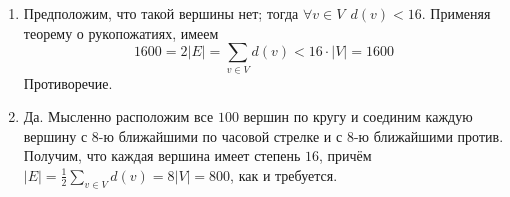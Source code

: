 \begin{Answer}
    \noindent
    \begin{enumerate}[label=\textbf{\alph*)}]
        \item
            Предположим, что такой вершины нет;
            тогда $ \forall v \in V \;\, d(v) < 16 $.
            Применяя теорему о рукопожатиях, имеем
            \[
                1600 = 2 |E| = \sum_{v \in V} d(v) < 16 \cdot |V| = 1600
            \]
            Противоречие.
        \item
            Да.
            Мысленно расположим все $ 100 $ вершин по кругу и соединим каждую вершину с $ 8 $-ю ближайшими по часовой стрелке и с $ 8 $-ю ближайшими против.
            Получим, что каждая вершина имеет степень $ 16 $, причём $ \displaystyle |E| = \frac{1}{2} \sum_{v \in V} d(v) = 8 |V| = 800 $, как и требуется.
    \end{enumerate}
\end{Answer}

